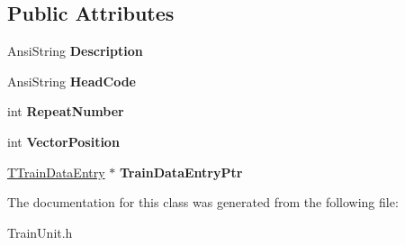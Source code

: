 \subsection*{Public Attributes}
\begin{DoxyCompactItemize}
\item 
\mbox{\label{class_t_train_controller_1_1_t_continuation_train_expectation_entry_a4f8cb6b7a1ab76fb56a56594aa440fe5}} 
Ansi\+String {\bfseries Description}
\item 
\mbox{\label{class_t_train_controller_1_1_t_continuation_train_expectation_entry_a385c1cedb6c4c81c59f38bc2ef3c50d9}} 
Ansi\+String {\bfseries Head\+Code}
\item 
\mbox{\label{class_t_train_controller_1_1_t_continuation_train_expectation_entry_aba462c168d94a8479f9b391b3ad90f5b}} 
int {\bfseries Repeat\+Number}
\item 
\mbox{\label{class_t_train_controller_1_1_t_continuation_train_expectation_entry_a77f5a64b552a6d938b1ab2a0e3488c11}} 
int {\bfseries Vector\+Position}
\item 
\mbox{\label{class_t_train_controller_1_1_t_continuation_train_expectation_entry_ad710cc4b0bde6c917aaba9c732773bcb}} 
\mbox{\hyperlink{class_t_train_data_entry}{T\+Train\+Data\+Entry}} $\ast$ {\bfseries Train\+Data\+Entry\+Ptr}
\end{DoxyCompactItemize}


The documentation for this class was generated from the following file\+:\begin{DoxyCompactItemize}
\item 
Train\+Unit.\+h\end{DoxyCompactItemize}
